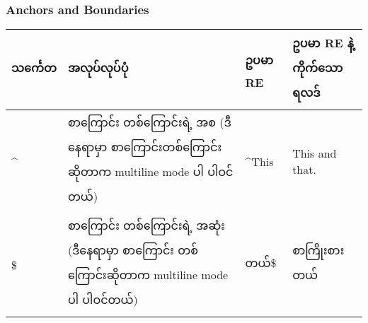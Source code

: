 \documentclass[11pt]{article}
\begin{document}
    \subsubsection{Anchors and Boundaries}\label{anchors-and-boundaries}

\begin{longtable}[c]{@{}llll@{}}
\toprule
\begin{minipage}[b]{0.12\columnwidth}\raggedright\strut
သင်္ကေတ
\strut\end{minipage} &
\begin{minipage}[b]{0.15\columnwidth}\raggedright\strut
အလုပ်လုပ်ပုံ
\strut\end{minipage} &
\begin{minipage}[b]{0.12\columnwidth}\raggedright\strut
ဥပမာ RE
\strut\end{minipage} &
\begin{minipage}[b]{0.10\columnwidth}\raggedright\strut
ဥပမာ RE နဲ့ ကိုက်သောရလဒ်
\strut\end{minipage}\tabularnewline
\midrule
\endhead
\begin{minipage}[t]{0.12\columnwidth}\raggedright\strut
\^{}
\strut\end{minipage} &
\begin{minipage}[t]{0.15\columnwidth}\raggedright\strut
စာကြောင်း တစ်ကြောင်းရဲ့ အစ (ဒီနေရာမှာ စာကြောင်းတစ်ကြောင်းဆိုတာက
multiline mode ပါ ပါဝင်တယ်)
\strut\end{minipage} &
\begin{minipage}[t]{0.12\columnwidth}\raggedright\strut
\^{}This
\strut\end{minipage} &
\begin{minipage}[t]{0.10\columnwidth}\raggedright\strut
{This} and that.
\strut\end{minipage}\tabularnewline
\begin{minipage}[t]{0.12\columnwidth}\raggedright\strut
\$
\strut\end{minipage} &
\begin{minipage}[t]{0.15\columnwidth}\raggedright\strut
စာကြောင်း တစ်ကြောင်းရဲ့ အဆုံး (ဒီနေရာမှာ စာကြောင်း တစ်ကြောင်းဆိုတာက
multiline mode ပါ ပါဝင်တယ်)
\strut\end{minipage} &
\begin{minipage}[t]{0.12\columnwidth}\raggedright\strut
တယ်\$
\strut\end{minipage} &
\begin{minipage}[t]{0.10\columnwidth}\raggedright\strut
စာကြိုးစား{တယ်}
\strut\end{minipage}\tabularnewline

\end{longtable}
\end{document}
